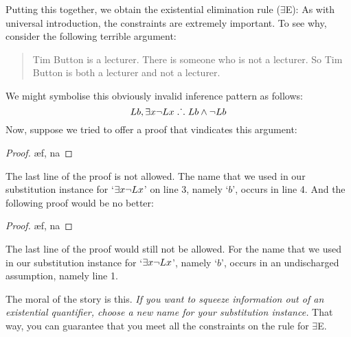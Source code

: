 Putting this together, we obtain the existential elimination rule ($\exists$E):
As with universal introduction, the constraints are extremely important. To see why, consider the following terrible argument:
	\begin{quote}
		Tim Button is a lecturer. There is someone who is not a lecturer. So Tim Button is both a lecturer and not a lecturer.
	\end{quote}
We might symbolise this obviously invalid inference pattern as follows:
$$Lb, \exists x \neg Lx \mathrel{\ldotp\dot{}\,\ldotp} Lb \wedge \neg Lb$$
Now, suppose we tried to offer a proof that vindicates this argument:
\begin{proof}
	\open	
		\ae{f, na}
	\close
\end{proof}
The last line of the proof is not allowed. The name that we used in our substitution instance for `$\exists x \neg Lx$' on line 3, namely `$b$', occurs in line 4. And the following proof would be no better:
\begin{proof}
	\open	
		\ae{f, na}
	\close
\end{proof}
The last line of the proof would still not be allowed. For the name that we used in our substitution instance for `$\exists x \neg Lx$', namely `$b$', occurs in an undischarged assumption, namely line 1. 

The moral of the story is this. \emph{If you want to squeeze information out of an existential quantifier, choose a new name for your substitution instance.} That way, you can guarantee that you meet all the constraints on the rule for $\exists$E.

